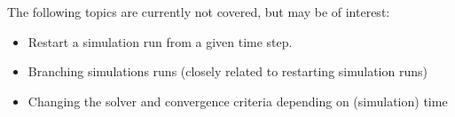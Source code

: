 The following topics are currently not covered, but may be of interest:

\begin{itemize}
    \item Restart a simulation run from a given time step.
    \item Branching simulations runs (closely related to restarting simulation runs)
    \item Changing the solver and convergence criteria depending on (simulation) time
\end{itemize}